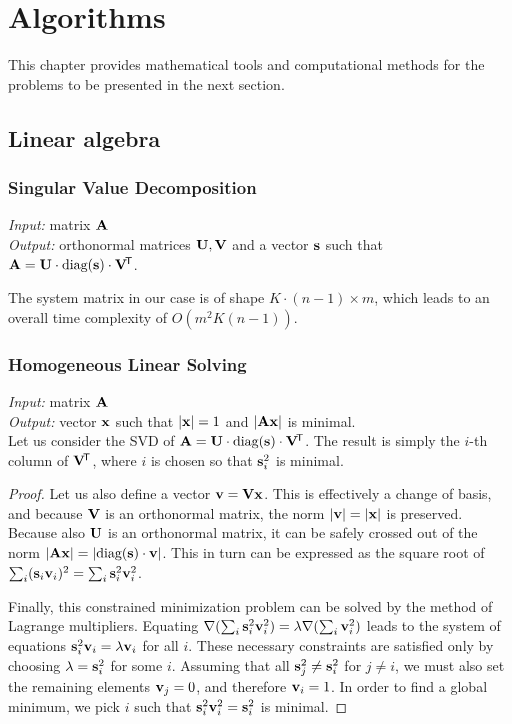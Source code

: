 \chapter{Algorithms}

This chapter provides mathematical tools and computational methods for the problems to be presented in the next section.

\section{Linear algebra}

\subsection{Singular Value Decomposition}
\textit{Input:} matrix $\mathbf{A}$\\
\textit{Output:} orthonormal matrices $\mathbf{U}, \mathbf{V}$ and a vector $\mathbf{s}$ such that $\mathbf{A} = \mathbf{U} \cdot \textrm{diag}(\mathbf{s}) \cdot \mathbf{V}^{\!\mathsf{T}}$.\\


The system matrix in our case is of shape $K \cdot (n - 1) \times m$, which leads to an overall time complexity of $O(m^2 K (n - 1))$.

\subsection{Homogeneous Linear Solving}
\textit{Input:} matrix $\mathbf{A}$\\
\textit{Output:} vector $\mathbf{x}$ such that $|\mathbf{x}| = 1$ and $|\mathbf{A} \mathbf{x}|$ is minimal.\\

Let us consider the SVD of $\mathbf{A} = \mathbf{U} \cdot \textrm{diag}(\mathbf{s}) \cdot \mathbf{V}^{\!\mathsf{T}}$.
The result is simply the $i$-th column of $\mathbf{V} ^{\!\mathsf{T}}$, where $i$ is chosen so that $\mathbf{s}_i^2$ is minimal.

\begin{proof}
Let us also define a vector $\mathbf{v} = \mathbf{V} \mathbf{x}$.
This is effectively a change of basis, and because $\mathbf{V}$ is an orthonormal matrix, the norm $|\mathbf{v}| = |\mathbf{x}|$ is preserved.
Because also $\mathbf{U}$ is an orthonormal matrix, it can be safely crossed out of the norm $|\mathbf{A} \mathbf{x}| = |\textrm{diag}(\mathbf{s}) \cdot \mathbf{v}|$.
This in turn can be expressed as the square root of $\sum_i (\mathbf{s}_i \mathbf{v}_i)^2 = \sum_i \mathbf{s}_i^2 \mathbf{v}_i^2$.

Finally, this constrained minimization problem can be solved by the method of Lagrange multipliers.
Equating $\nabla(\sum_i \mathbf{s}_i^2 \mathbf{v}_i^2) = \lambda \nabla (\sum_i \mathbf{v}_i^2)$ leads to the system of equations $\mathbf{s}_i^2 \mathbf{v}_i = \lambda \mathbf{v}_i$ for all $i$.
These necessary constraints are satisfied only by choosing $\lambda = \mathbf{s}_i^2$ for some $i$.
Assuming that all $\mathbf{s}_j^2 \neq \mathbf{s}_i^2$ for $j \neq i$, we must also set the remaining elements $\mathbf{v}_j = 0$, and therefore $\mathbf{v}_i = 1$.
In order to find a global minimum, we pick $i$ such that $\mathbf{s}_i^2 \mathbf{v}_i^2 = \mathbf{s}_i^2$ is minimal.
\end{proof}

